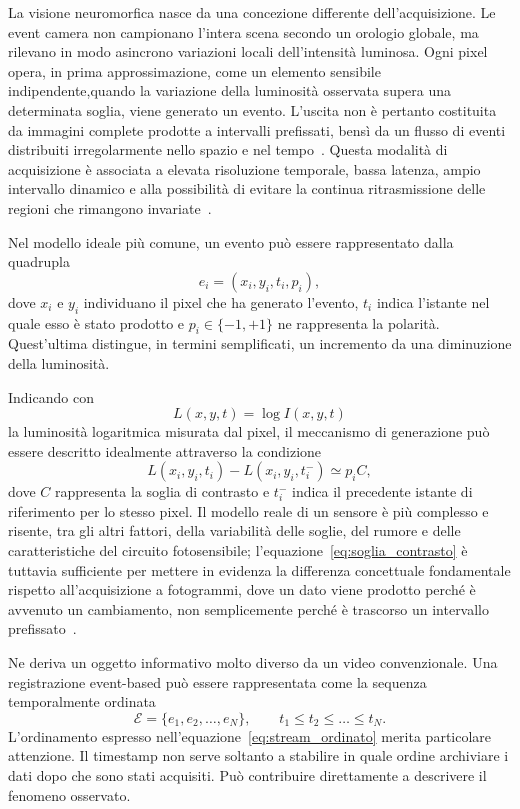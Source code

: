 La visione neuromorfica nasce da una concezione differente dell'acquisizione. Le event camera non campionano l'intera scena secondo un orologio globale, ma rilevano in modo asincrono variazioni locali dell'intensità luminosa. Ogni pixel opera, in prima approssimazione, come un elemento sensibile indipendente,quando la variazione della luminosità osservata supera una determinata soglia, viene generato un evento. L'uscita non è pertanto costituita da immagini complete prodotte a intervalli prefissati, bensì da un flusso di eventi distribuiti irregolarmente nello spazio e nel tempo~\cite{gallego2022event}. Questa modalità di acquisizione è associata a elevata risoluzione temporale, bassa latenza, ampio intervallo dinamico e alla possibilità di evitare la continua ritrasmissione delle regioni che rimangono invariate~\cite{gallego2022event}.

Nel modello ideale più comune, un evento può essere rappresentato dalla quadrupla
\begin{equation}
\label{eq:evento_quadrupla}
e_i = (x_i, y_i, t_i, p_i),
\end{equation}
dove $x_i$ e $y_i$ individuano il pixel che ha generato l'evento, $t_i$ indica l'istante nel quale esso è stato prodotto e $p_i \in \{-1, +1\}$ ne rappresenta la polarità. Quest'ultima distingue, in termini semplificati, un incremento da una diminuzione della luminosità.

Indicando con
\begin{equation}
L(x, y, t) = \log I(x, y, t)
\end{equation}
la luminosità logaritmica misurata dal pixel, il meccanismo di generazione può essere descritto idealmente attraverso la condizione
\begin{equation}
\label{eq:soglia_contrasto}
L(x_i, y_i, t_i) - L(x_i, y_i, t_i^-) \simeq p_i C,
\end{equation}
dove $C$ rappresenta la soglia di contrasto e $t_i^-$ indica il precedente istante di riferimento per lo stesso pixel. Il modello reale di un sensore è più complesso e risente, tra gli altri fattori, della variabilità delle soglie, del rumore e delle caratteristiche del circuito fotosensibile; l'equazione~\eqref{eq:soglia_contrasto} è tuttavia sufficiente per mettere in evidenza la differenza concettuale fondamentale rispetto all'acquisizione a fotogrammi, dove un dato viene prodotto perché è avvenuto un cambiamento, non semplicemente perché è trascorso un intervallo prefissato~\cite{gallego2022event}.

Ne deriva un oggetto informativo molto diverso da un video convenzionale. Una registrazione event-based può essere rappresentata come la sequenza temporalmente ordinata
\begin{equation}
\label{eq:stream_ordinato}
\mathcal{E} = \{e_1, e_2, \dots, e_N\}, \qquad t_1 \leq t_2 \leq \dots \leq t_N.
\end{equation}
L'ordinamento espresso nell'equazione~\eqref{eq:stream_ordinato} merita particolare attenzione. Il timestamp non serve soltanto a stabilire in quale ordine archiviare i dati dopo che sono stati acquisiti. Può contribuire direttamente a descrivere il fenomeno osservato.

